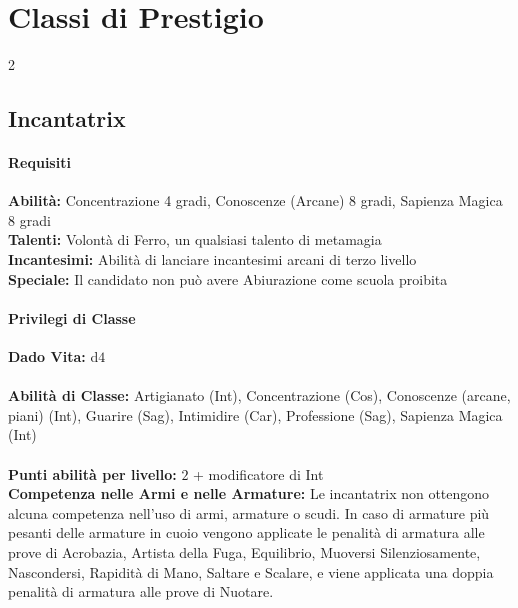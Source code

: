 \documentclass[10pt, a4paper]{report}
\begin{document}
\chapter{Classi di Prestigio}
\begin{multicols}{2}
\section{Incantatrix}

\subsubsection*{Requisiti}
\textbf{Abilità:} Concentrazione 4 gradi, Conoscenze (Arcane) 8 gradi, Sapienza Magica 8 gradi\\
\textbf{Talenti:} Volontà di Ferro, un qualsiasi talento di metamagia\\
\textbf{Incantesimi:} Abilità di lanciare incantesimi arcani di terzo livello\\
\textbf{Speciale:} Il candidato non può avere Abiurazione come scuola proibita\\
\subsubsection*{Privilegi di Classe}
\textbf{Dado Vita:} d$4$\\
\\
\textbf{Abilità di Classe:} Artigianato (Int), Concentrazione (Cos), Conoscenze (arcane, piani) (Int), Guarire (Sag), Intimidire (Car), Professione (Sag), Sapienza Magica (Int)\\
\\
\textbf{Punti abilità per livello:} $2$ + modificatore di Int\\

\textbf{Competenza nelle Armi e nelle Armature:} Le incantatrix non ottengono alcuna competenza nell'uso di armi, armature o scudi. In caso di armature più pesanti delle armature in cuoio vengono applicate le penalità di armatura alle prove di Acrobazia, Artista della Fuga, Equilibrio, Muoversi Silenziosamente, Nascondersi, Rapidità di Mano, Saltare e Scalare, e viene applicata una doppia penalità di armatura alle prove di Nuotare.\\


\end{multicols}
\end{document}
